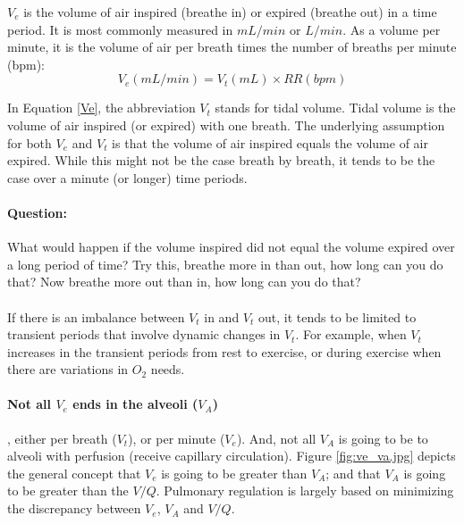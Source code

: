 $V_e$ is the volume of air inspired (breathe in) or expired (breathe out) in a time period. It is most commonly measured in $mL/min$ or $L/min$. As a volume per minute, it is the volume of air per breath times the number of breaths per minute (bpm):
\vspace{3mm}
\begin{equation}
    V_e (mL/min) = V_t (mL) \times RR (bpm)
    \label{Ve}
\end{equation}
\vspace{3mm}

In Equation \ref{Ve}, the abbreviation $V_t$ stands for tidal volume. Tidal volume is the volume of air inspired (or expired) with one breath. The underlying assumption for both $V_e$ and $V_t$ is that the volume of air inspired equals the volume of air expired. While this might not be the case breath by breath, it tends to be the case over a minute (or longer) time periods.

\paragraph{Question:} What would happen if the volume inspired did not equal the volume expired over a long period of time? Try this, breathe more in than out, how long can you do that? Now breathe more out than in, how long can you do that?

\paragraph{} If there is an imbalance between $V_t$ in and $V_t$ out, it tends to be limited to transient periods that involve dynamic changes in $V_t$. For example, when $V_t$ increases in the transient periods from rest to exercise, or during exercise when there are variations in $O_2$ needs.

\paragraph{Not all $V_e$ ends in the alveoli ($V_A$)}, either per breath ($V_t$), or per minute ($V_e$). And, not all $V_A$ is going to be to alveoli with perfusion (receive capillary circulation). Figure \ref{fig:ve_va.jpg} depicts the general concept that $V_e$ is going to be greater than $V_A$; and that $V_A$ is going to be greater than the $V/Q$. Pulmonary regulation is largely based on minimizing the discrepancy between $V_e$, $V_A$ and $V/Q$.

